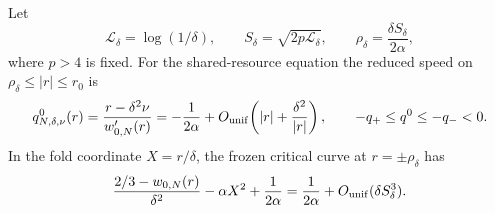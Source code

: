 \begin{proposition}
Let
\begin{equation}
 \mathscr L_\delta=\log(1/\delta),\qquad
 S_\delta=\sqrt{2p\mathscr L_\delta},\qquad
 \rho_\delta=\frac{\delta S_\delta}{2\alpha},
 \label{eq:anchor-toolkit-fold-scales}
\end{equation}
where \(p>4\) is fixed.  For the shared-resource equation the reduced speed
on \(\rho_\delta\le |r|\le r_0\) is
\begin{equation}
 q_{N,\delta,\nu}^{0}(r)
 =\frac{r-\delta^2\nu}{w_{0,N}'(r)}
 =-\frac1{2\alpha}
   +O_{\rm unif}\!\left(|r|+\frac{\delta^2}{|r|}\right),
 \qquad -q_+\le q^0\le-q_-<0.
 \label{eq:anchor-toolkit-reduced-speed}
\end{equation}
In the fold coordinate \(X=r/\delta\), the frozen critical curve at
\(r=\pm\rho_\delta\) has
\begin{equation}
 \frac{2/3-w_{0,N}(r)}{\delta^2}-\alpha X^2
       +\frac1{2\alpha}
 =\frac1{2\alpha}+O_{\rm unif}(\delta S_\delta^3).
 \label{eq:anchor-toolkit-critical-fold-offset}
\end{equation}


\end{proposition}
